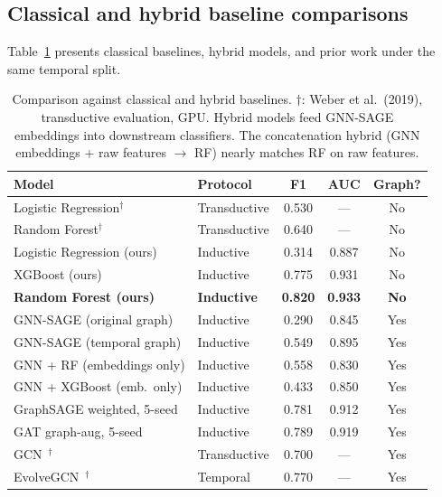 \subsection{Classical and hybrid baseline comparisons}
\label{sec:classical}

Table~\ref{tab:classical} presents classical baselines, hybrid models,
and prior work under the same temporal split.

\begin{table}[!htbp]
\centering
\caption{Comparison against classical and hybrid baselines.
  $\dagger$: Weber et al.\ (2019), transductive evaluation, GPU.
  Hybrid models feed GNN-SAGE embeddings into downstream classifiers.
  The concatenation hybrid (GNN embeddings + raw features $\to$ RF)
  nearly matches RF on raw features.}
\label{tab:classical}
\small
\begin{tabular}{llccc}
\toprule
\textbf{Model} & \textbf{Protocol} & \textbf{F1} & \textbf{AUC} & \textbf{Graph?} \\
\midrule
Logistic Regression$^\dagger$ & Transductive & 0.530 & --- & No \\
Random Forest$^\dagger$       & Transductive & 0.640 & --- & No \\
\midrule
Logistic Regression (ours)    & Inductive    & 0.314 & 0.887 & No \\
XGBoost (ours)                & Inductive    & 0.775 & 0.931 & No \\
\textbf{Random Forest (ours)} & \textbf{Inductive} & \textbf{0.820} & \textbf{0.933} & \textbf{No} \\
\midrule
GNN-SAGE (original graph)     & Inductive    & 0.290 & 0.845 & Yes \\
GNN-SAGE (temporal graph)     & Inductive    & 0.549 & 0.895 & Yes \\
GNN + RF (embeddings only)    & Inductive    & 0.558 & 0.830 & Yes \\
GNN + XGBoost (emb.\ only)   & Inductive    & 0.433 & 0.850 & Yes \\
GraphSAGE weighted, 5-seed    & Inductive    & 0.781 & 0.912 & Yes \\
GAT graph-aug, 5-seed         & Inductive    & 0.789 & 0.919 & Yes \\
\midrule
GCN~\citep{weber2019}$^\dagger$       & Transductive & 0.700 & --- & Yes \\
EvolveGCN~\citep{pareja2020evolvegcn}$^\dagger$ & Temporal & 0.770 & --- & Yes \\
\bottomrule
\end{tabular}
\end{table}

